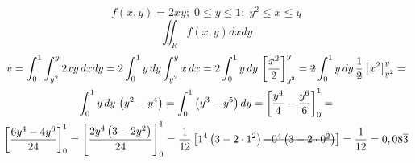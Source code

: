 \begin{enumerate}
	\begin{equation*}
		f(x,y) = 2xy;\; 0 \leq y \leq 1;\; y^2 \leq x \leq y
	\end{equation*}
	\begin{equation*}
		\iint_R f(x, y) dx dy
	\end{equation*}
	\begin{gather*}
		v = \int_0^1 \int_{y^2}^y 2xy\, dx dy = 2\int_0^1 y\, dy \int_{y^2}^y x\, dx = 2\int_0^1 y\, dy\, \left[\dfrac{x^2}{2}\right]_{y^2}^y = \overstrike{2}\int_0^1 y\, dy\, \dfrac{1}{\overstrike{2}}\left[x^2\right]_{y^2}^y =\\ \int_0^1 y\, dy\, \left(y^2 - y^4\right) = \int_0^1 \left(y^3 - y^5\right) dy = \left[\frac{y^4}{4} - \frac{y^6}{6}\right]_0^1 =\\ \left[\dfrac{6y^4 - 4y^6}{24}\right]_0^1 = \left[\dfrac{2y^4\left(3 - 2y^2\right)}{24}\right]_0^1 = \dfrac{1}{12}\left[1^4\left(3 - 2\cdot1^2\right) \overstrike{- 0^4\left(3 - 2\cdot0^2\right)}\right] = \dfrac{1}{12} = 0,08\overline{3}
	\end{gather*}
\end{enumerate}